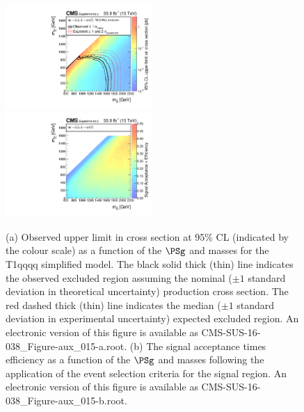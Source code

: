 \clearpage
\begin{figure}
    \begin{center}
            \includegraphics[width=0.50\textwidth]{Supplementary/CMS-SUS-16-038_Figure-aux_015-a}
            \includegraphics[width=0.50\textwidth]{Supplementary/CMS-SUS-16-038_Figure-aux_015-b}
        \caption{ (a) Observed upper limit in cross section at 95\% CL (indicated
        by the colour scale) as a function of 
        the $\PSg$ and \PSGczDo %
        masses for the 
        T1qqqq %
        simplified  model.  The  black  solid thick  (thin)  line indicates  the
        observed  excluded  region  assuming   the  nominal  (${\pm}1$  standard
        deviation in theoretical uncertainty)  production cross section. The red
        dashed  thick  (thin)  line  indicates  the  median  (${\pm}1$  standard
        deviation in experimental uncertainty) expected excluded region.
    An electronic version of this figure is available as CMS-SUS-16-038\_Figure-aux\_015-a.root.
        (b) The signal acceptance times efficiency as a function of 
        the $\PSg$ and \PSGczDo %
        masses following the application of the event selection criteria for the signal region.
    An electronic version of this figure is available as CMS-SUS-16-038\_Figure-aux\_015-b.root.
        }
        \label{fig:T1qqqq}
    \end{center}
\end{figure}

